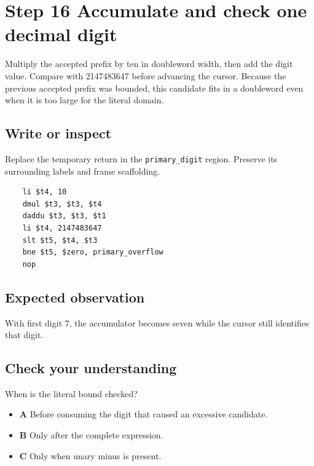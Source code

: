 \section{Step 16 Accumulate and check one decimal digit}\label{expression-s16}

Multiply the accepted prefix by ten in doubleword width, then add the digit value. Compare with 2147483647 before advancing the cursor. Because the previous accepted prefix was bounded, this candidate fits in a doubleword even when it is too large for the literal domain.

\subsection{Write or inspect}
Replace the temporary return in the \texttt{primary\_digit} region. Preserve its surrounding labels and frame scaffolding.

\begin{verbatim}
    li $t4, 10
    dmul $t3, $t3, $t4
    daddu $t3, $t3, $t1
    li $t4, 2147483647
    slt $t5, $t4, $t3
    bne $t5, $zero, primary_overflow
    nop
\end{verbatim}
\subsection{Expected observation}
With first digit 7, the accumulator becomes seven while the cursor still identifies that digit.

\subsection{Check your understanding}
When is the literal bound checked?

\begin{itemize}
  \item \textbf{A} Before consuming the digit that caused an excessive candidate.
  \item \textbf{B} Only after the complete expression.
  \item \textbf{C} Only when unary minus is present.
\end{itemize}
